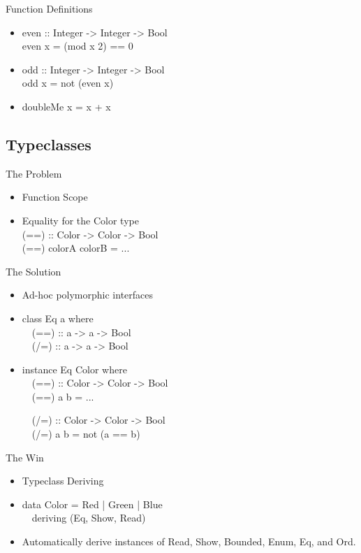 \documentclass{beamer}                  %
\newcommand{\srule}{
	\rule{\textwidth}{1pt}\\
}
\newlength{\subsecwidth}
\newenvironment{slide}{
	\begin{frame} %
	\settowidth{\subsecwidth}{\insertsubsection} %
	\ifthenelse{\dimtest{\subsecwidth}{<}{1pt}}{ %
		\frametitle{\insertsection\\             %
		\vspace{-1ex}                            %
		\color{fore}\srule                       %
		\par                                     %
		\vspace{-3ex}                            %
		}
	}{                                           %
		\frametitle{\insertsection\ -- \insertsubsection\\ %
		\vspace{-1ex}                            %
		\color{fore}\srule                       %
		\par                                     %
		\vspace{-3ex}                            %
		}
	}
	\Large                                       %
}{
	\end{frame}
}
\begin{document}
\begin{slide}
  Function Definitions
  \begin{itemize}
    \item

      even :: Integer -> Integer -> Bool\\
      even x = (mod x 2) == 0
    \item
      odd :: Integer -> Integer -> Bool\\
      odd x = not (even x)
    \item
      doubleMe x = x + x
  \end{itemize}
\end{slide}

\subsection{Typeclasses}

\begin{slide}
  The Problem
  \begin{itemize}
    \item Function Scope
    \item Equality for the Color type\\

      (==) :: Color -> Color -> Bool\\
      (==) colorA colorB = ...
  \end{itemize}
\end{slide}

\begin{slide}
  The Solution
  \begin{itemize}
    \item Ad-hoc polymorphic interfaces
    \item

      class Eq a where\\
      ~~(==) :: a -> a -> Bool\\
      ~~(/=) :: a -> a -> Bool
    \item

      instance Eq Color where\\
      ~~(==) :: Color -> Color -> Bool\\
      ~~(==) a b = ...

      ~~(/=) :: Color -> Color -> Bool\\
      ~~(/=) a b = not (a == b)
  \end{itemize}
\end{slide}

\begin{slide}
  The Win
  \begin{itemize}
    \item Typeclass Deriving
    \item

      data Color = Red | Green | Blue\\
      ~~deriving (Eq, Show, Read)
    \item Automatically derive instances of Read, Show, Bounded, Enum, Eq, and Ord.
  \end{itemize}
\end{slide}
\end{document}
